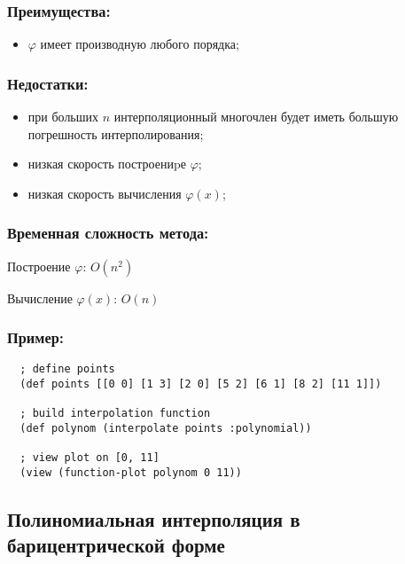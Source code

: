 \subsubsection{Преимущества:}

\begin{itemize}
\item $\varphi$ имеет производную любого порядка;
\end{itemize}

\subsubsection{Недостатки:}

\begin{itemize}
\item при больших $n$ интерполяционный многочлен будет иметь большую погрешность интерполирования;
\item низкая скорость построениpе $\varphi$;
\item низкая скорость вычисления $\varphi(x)$;
\end{itemize}

\subsubsection{Временная сложность метода:}

Построение $\varphi$: $O(n^2)$

Вычисление $\varphi(x)$: $O(n)$

\subsubsection{Пример:}

\begin{verbatim}
  ; define points
  (def points [[0 0] [1 3] [2 0] [5 2] [6 1] [8 2] [11 1]])

  ; build interpolation function
  (def polynom (interpolate points :polynomial))

  ; view plot on [0, 11]
  (view (function-plot polynom 0 11))
\end{verbatim}




\subsection{Полиномиальная интерполяция в барицентрической форме}

